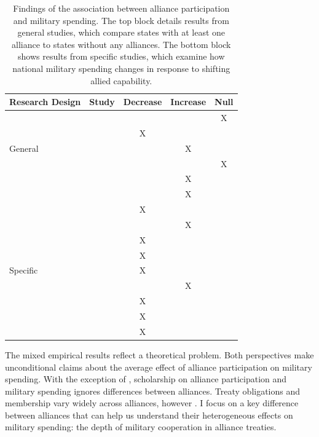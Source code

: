 \documentclass[12pt]{article}
\begin{document}
\begin{table}[hbt!]
\begin{center}
\begin{tabular}{lcccc}
   Research Design  & Study & Decrease & Increase & Null \\
\hline
\multirow{5}{*}{General} & \citet{MostSiverson1987} &  &  & X \\
 & \citet{Conybeare1994}    & X & &  \\
 & \citet{Diehl1994}        &  & X &  \\
 & \citet{Goldsmith2003}    &  &  & X \\
 & \citet{MorganPalmer2006} &  & X & \\ 
 & \citet{QuirozFlores2011} &  & X &  \\ 
 & \citet{OnealWhatley1996} & X &  & \\ 
 \hline
 \multirow{7}{*}{Specific} &\citet{ConybeareSandler1990} &   & X &  \\
 &\citet{BarnettLevy1991} & X  &  &  \\
 &\citet{Morrow1993}      & X  &  &  \\
 &\citet{Sorokin1994}     & X  &  &  \\
 &\citet{Chenetal1996}    &  & X &  \\
 &\citet{PluemperNeumayer2015} & X &  &  \\
 &\citet{GeorgeSandler2017} & X &  &  \\
 &\citet{OlsonZeckhauser1966} & X & & \\
\hline
\end{tabular}
\caption{Findings of the association between alliance participation and military spending. The top block details results from general studies, which compare states with at least one alliance to states without any alliances. The bottom block shows results from specific studies, which examine how national military spending changes in response to shifting allied capability.}
\label{tab:results-sum}
\end{center} 
\end{table}


The mixed empirical results reflect a theoretical problem. 
Both perspectives make unconditional claims about the average effect of alliance participation on military spending.  
With the exception of \citet{DigiuseppePoast2016}, scholarship on alliance participation and military spending ignores differences between alliances.
Treaty obligations and membership vary widely across alliances, however \citep{Leedsetal2002}. 
I focus on a key difference between alliances that can help us understand their heterogeneous effects on military spending: the depth of military cooperation in alliance treaties.
\end{document}
